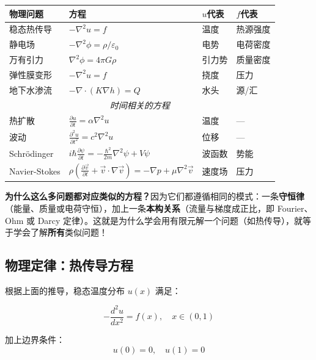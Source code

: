 \begin{center}
\renewcommand{\arraystretch}{1.4}
\begin{tabular}{l|l|l|l}
\toprule
\textbf{物理问题} & \textbf{方程} & \textbf{$u$代表} & \textbf{$f$代表} \\
\midrule
稳态热传导 & $-\nabla^2 u = f$ & 温度 & 热源强度 \\
静电场 & $-\nabla^2 \phi = \rho/\varepsilon_0$ & 电势 & 电荷密度 \\
万有引力 & $\nabla^2 \phi = 4\pi G\rho$ & 引力势 & 质量密度 \\
弹性膜变形 & $-\nabla^2 u = f$ & 挠度 & 压力 \\
地下水渗流 & $-\nabla \cdot (K\nabla h) = Q$ & 水头 & 源/汇 \\
\midrule
\multicolumn{4}{c}{\textit{时间相关的方程}} \\
\midrule
热扩散 & $\frac{\partial u}{\partial t} = \alpha \nabla^2 u$ & 温度 & — \\
波动 & $\frac{\partial^2 u}{\partial t^2} = c^2 \nabla^2 u$ & 位移 & — \\
Schrödinger & $i\hbar\frac{\partial \psi}{\partial t} = -\frac{\hbar^2}{2m}\nabla^2\psi + V\psi$ & 波函数 & 势能 \\
Navier-Stokes & $\rho(\frac{\partial \vec{v}}{\partial t} + \vec{v}\cdot\nabla\vec{v}) = -\nabla p + \mu\nabla^2\vec{v}$ & 速度场 & 压力 \\
\bottomrule
\end{tabular}
\end{center}

\begin{insightbox}
\textbf{为什么这么多问题都对应类似的方程？}因为它们都遵循相同的模式：一条\textbf{守恒律}（能量、质量或电荷守恒），加上一条\textbf{本构关系}（流量与梯度成正比，即 Fourier、Ohm 或 Darcy 定律）。这就是为什么学会用有限元解一个问题（如热传导），就等于学会了解\textbf{所有}类似问题！
\end{insightbox}

\subsection{物理定律：热传导方程}

根据上面的推导，稳态温度分布 $u(x)$ 满足：

\begin{equation}
-\frac{d^2 u}{dx^2} = f(x), \quad x \in (0, 1)
\end{equation}

加上边界条件：
\begin{equation}
u(0) = 0, \quad u(1) = 0
\end{equation}

